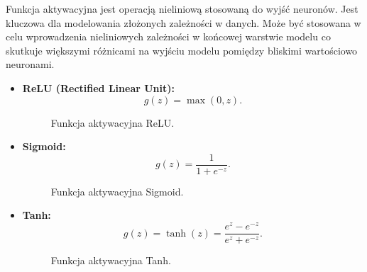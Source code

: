 Funkcja aktywacyjna jest operacją nieliniową stosowaną do wyjść neuronów. Jest kluczowa dla modelowania złożonych zależności w danych.
Może być stosowana w celu wprowadzenia nieliniowych zależności w końcowej warstwie modelu co skutkuje większymi różnicami na wyjściu modelu pomiędzy bliskimi wartościowo neuronami.

\begin{itemize}
	\item{\textbf{ReLU (Rectified Linear Unit):}
	      \[
		      g(z) = \max(0, z).
	      \]
	      \begin{figure}[ht]
		      \centering
		      \caption{Funkcja aktywacyjna ReLU.}
		      \label{fig:relu}
	      \end{figure}
	      }
	\item{
	      \textbf{Sigmoid:}
	      \[
		      g(z) = \frac{1}{1 + e^{-z}}.
	      \]
	      \begin{figure}[ht]
		      \centering
		      \caption{Funkcja aktywacyjna Sigmoid.}
		      \label{fig:sigmoid}
	      \end{figure}
	      }
	\item {
	      \textbf{Tanh:}
	      \[
		      g(z) = \tanh(z) = \frac{e^z - e^{-z}}{e^z + e^{-z}}.
	      \]

	      \begin{figure}[ht]
		      \centering
		      \caption{Funkcja aktywacyjna Tanh.}
		      \label{fig:tanh}
	      \end{figure}
	      }
\end{itemize}

